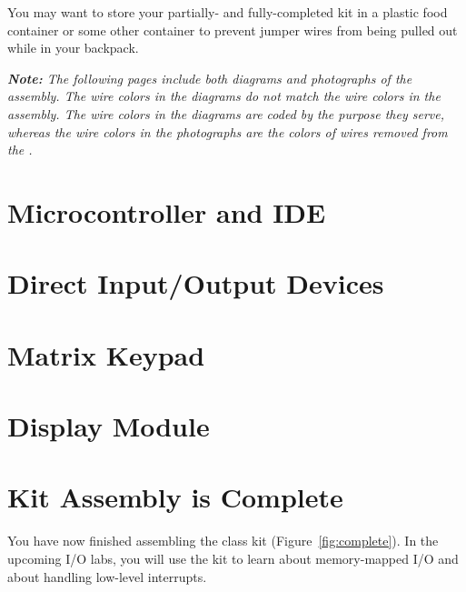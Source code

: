     You may want to store your partially- and fully-completed kit in a plastic food container or some other container to prevent jumper wires from being pulled out while in your backpack.

    \textit{
        \textbf{Note:} The following pages include both diagrams and photographs of the assembly.
        The wire colors in the diagrams do not match the wire colors in the assembly.
        The wire colors in the diagrams are coded by the purpose they serve, whereas the wire colors in the photographs are the colors of wires removed from the \rainbow.
    }

\section{Microcontroller and IDE} 

\section{Direct Input/Output Devices} 

\section{Matrix Keypad} 

\section{Display Module} 

\section*{Kit Assembly is Complete}

    You have now finished assembling the class kit (Figure~\ref{fig:complete}).
    In the upcoming I/O labs, you will use the kit to learn about memory-mapped I/O and about handling low-level interrupts.

